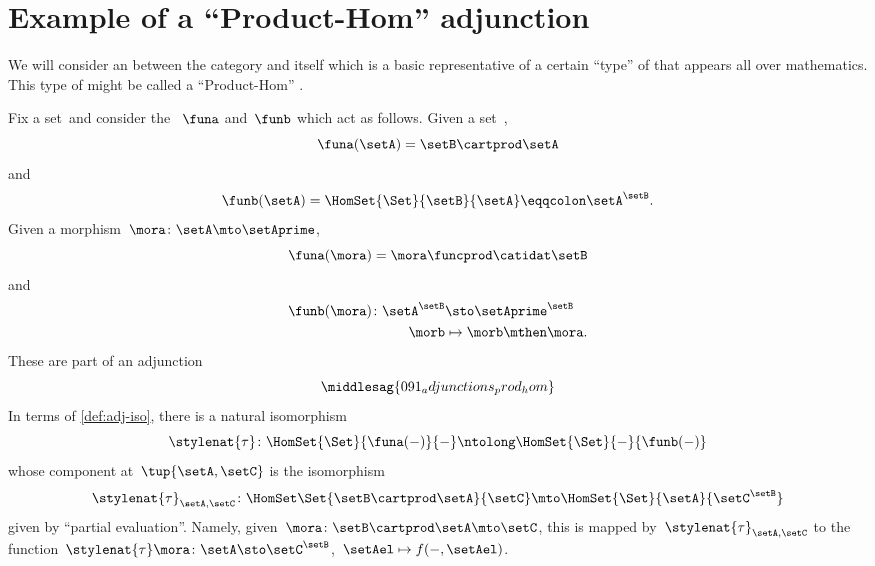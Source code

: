 
\section[Product-Hom adjunction]{Example of a ``Product-Hom'' adjunction}
We will consider an  between the category \Set and itself which is a basic representative of a certain ``type'' of  that appears all over mathematics.
This type of  might be called a ``Product-Hom'' .

Fix a set~\setB and consider the ~$\funa$ and~$\funb$ which act as follows.
Given a set~\setA,
\begin{equation}\label{eq:product-with-a-set-functor-objects}
    \funa(\setA) = \setB \cartprod \setA
\end{equation}
and
\begin{equation}\label{eq:set-expontiation-functor-objects}
    \funb(\setA) = \HomSet{\Set}{\setB}{\setA} \eqqcolon \setA^\setB.
\end{equation}
Given a morphism~$\mora\colon \setA \mto \setAprime$,
\begin{equation}\label{eq:product-with-a-set-functor-morphisms}
    \funa(\mora) = \mora \funcprod \catidat\setB
\end{equation}
and
\begin{equation}\label{eq:set-exponentiation-functor-morphisms}
    \begin{aligned}
        \funb(\mora)\colon \setA^\setB & \sto \setAprime^\setB \\
        \morb                          & \mapsto \morb \mthen \mora.
    \end{aligned}
\end{equation}
%
These  are part of an adjunction
%
\begin{equation}\label{eq:prod-hom-adjunction-diagram}
    \middlesag{091_adjunctions_prod_hom}
\end{equation}
In terms of \cref{def:adj-iso}, there is a natural isomorphism
\begin{equation}\label{eq:prod-hom-adjunction-transpose-nat-iso}
    \stylenat{\tau}\colon \HomSet{\Set}{\funa(- )}{-} \ntolong \HomSet{\Set}{-}{\funb( - )}
\end{equation}
whose component at~$\tup{\setA,\setC}$ is the isomorphism
\begin{equation}\label{eq:prod-hom-adjunction-transpose-components}
    \stylenat{\tau}_{\setA,\setC} \colon \HomSet\Set{\setB\cartprod \setA}{\setC} \mto \HomSet{\Set}{\setA}{\setC^\setB}
\end{equation}
given by ``partial evaluation''.
Namely, given~$\mora \colon \setB \cartprod \setA \mto \setC$, this is mapped by~$\stylenat{\tau}_{\setA,\setC}$ to the function~$\stylenat{\tau}\mora \colon \setA \sto \setC^\setB$,~$\setAel \mapsto f( -, \setAel)$.

